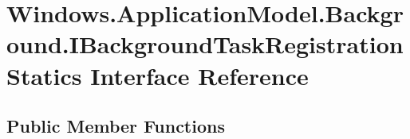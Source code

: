 \hypertarget{interface_windows_1_1_application_model_1_1_background_1_1_i_background_task_registration_statics}{}\section{Windows.\+Application\+Model.\+Background.\+I\+Background\+Task\+Registration\+Statics Interface Reference}
\label{interface_windows_1_1_application_model_1_1_background_1_1_i_background_task_registration_statics}
\subsection*{Public Member Functions}
